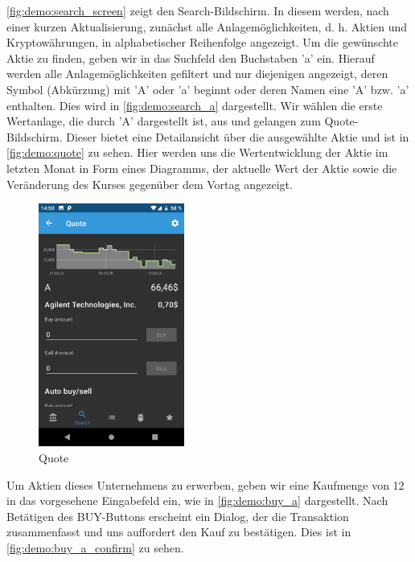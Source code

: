 \documentclass[a4paper]{article}
\begin{document}
\autoref{fig:demo:search_screen} zeigt den Search-Bildschirm. In diesem werden, nach einer kurzen Aktualisierung, zunächst alle Anlagemöglichkeiten, d. h. Aktien und Kryptowährungen, in alphabetischer Reihenfolge angezeigt. Um die gewünschte Aktie zu finden, geben wir in das Suchfeld den Buchstaben 'a' ein. Hierauf werden alle Anlagemöglichkeiten gefiltert und nur diejenigen angezeigt, deren Symbol (Abkürzung) mit 'A' oder 'a' beginnt oder deren Namen eine 'A' bzw. 'a' enthalten. Dies wird in \autoref{fig:demo:search_a} dargestellt. Wir wählen die erste Wertanlage, die durch 'A' dargestellt ist, aus und gelangen zum Quote-Bildschirm. Dieser bietet eine Detailansicht über die ausgewählte Aktie und ist in \autoref{fig:demo:quote} zu sehen. Hier werden uns die Wertentwicklung der Aktie im letzten Monat in Form eines Diagramms, der aktuelle Wert der Aktie sowie die Veränderung des Kurses gegenüber dem Vortag angezeigt.

\begin{figure}[H]
	\centering
	\includegraphics[height=8cm,keepaspectratio]{./images/demo/quote.png}
	\caption{Quote}
	\label{fig:demo:quote}
\end{figure}

Um Aktien dieses Unternehmens zu erwerben, geben wir eine Kaufmenge von 12 in das vorgesehene Eingabefeld ein, wie in \autoref{fig:demo:buy_a} dargestellt. Nach Betätigen des BUY-Buttons erscheint ein Dialog, der die Transaktion zusammenfasst und uns auffordert den Kauf zu bestätigen. Dies ist in \autoref{fig:demo:buy_a_confirm} zu sehen.
\end{document}
